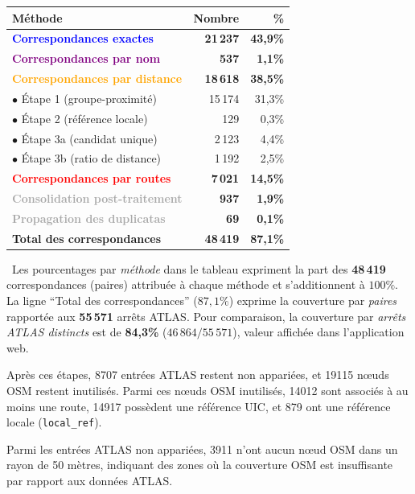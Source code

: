 \begin{tcolorbox}[colback=gray!10, colframe=brown, arc=5mm, boxrule=2pt, title={\textbf{Répartition des correspondances par méthode}}, fonttitle=\bfseries]
\vspace{0.3em}
\begin{tabular}{@{}l r@{\hspace{2em}}r@{}}
\toprule
\textbf{Méthode} & \textbf{Nombre} & \textbf{\%} \\
\midrule
\textcolor{blue}{\textbf{Correspondances exactes}} & \textbf{21\,237} & \textbf{43,9\%} \\
\textcolor{purple}{\textbf{Correspondances par nom}} & \textbf{537} & \textbf{1,1\%} \\
\textcolor{orange}{\textbf{Correspondances par distance}} & \textbf{18\,618} & \textbf{38,5\%} \\
\quad $\bullet$ Étape 1 (groupe-proximité) & 15\,174 & 31,3\% \\
\quad $\bullet$ Étape 2 (référence locale) & 129 & 0,3\% \\
\quad $\bullet$ Étape 3a (candidat unique) & 2\,123 & 4,4\% \\
\quad $\bullet$ Étape 3b (ratio de distance) & 1\,192 & 2,5\% \\
\textcolor{red}{\textbf{Correspondances par routes}} & \textbf{7\,021} & \textbf{14,5\%} \\
\textcolor{darkgray}{\textbf{Consolidation post-traitement}} & \textbf{937} & \textbf{1,9\%} \\
\textcolor{darkgray}{\textbf{Propagation des duplicatas}} & \textbf{69} & \textbf{0,1\%} \\
\midrule
\textbf{Total des correspondances} & \textbf{48\,419} & \textbf{87,1\%} \\
\bottomrule
\end{tabular}
\end{tcolorbox}

\begin{flushleft}\footnotesize
\textemdash\ Les pourcentages par \emph{méthode} dans le tableau expriment la part des \textbf{48\,419} correspondances (paires) attribuée à chaque méthode et s'additionnent à \(100\%\). La ligne ``Total des correspondances'' (\(87,1\%\)) exprime la couverture par \emph{paires} rapportée aux \textbf{55\,571} arrêts ATLAS. Pour comparaison, la couverture par \emph{arrêts ATLAS distincts} est de \textbf{84,3\%} (\(46\,864/55\,571\)), valeur affichée dans l'application web.
\end{flushleft}

Après ces étapes, 8707 entrées ATLAS restent non appariées, et 19115 nœuds OSM restent inutilisés. Parmi ces nœuds OSM inutilisés, 14012 sont associés à au moins une route, 14917 possèdent une référence UIC, et 879 ont une référence locale (\texttt{local\_ref}).

Parmi les entrées ATLAS non appariées, 3911 n'ont aucun nœud OSM dans un rayon de 50 mètres, indiquant des zones où la couverture OSM est insuffisante par rapport aux données ATLAS.


